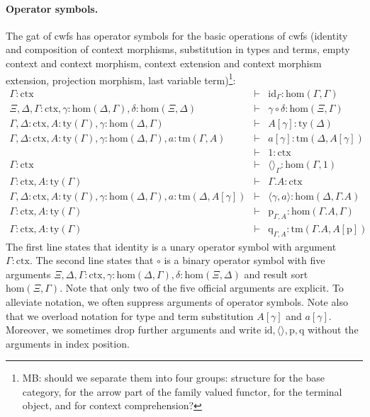 \documentclass[11pt,a4paper]{article}
\theoremstyle{plain}
\theoremstyle{definition}
\newcommand{\id}{\mathsf{id}}
\def\Hom{\mathrm{hom}}
\def\id{\mathrm{id}}
\newcommand{\ctx}{\mathrm{ctx}}
\newcommand{\ty}{\mathrm{ty}}
\newcommand{\tm}{\mathrm{tm}}
\newcommand{\tuple}[1]{\langle #1 \rangle}
\newcommand{\cext}{.}
\def\p{\mathrm{p}}
\def\q{\mathrm{q}}
\begin{document}
\paragraph{Operator symbols.}
The gat of cwfs has operator symbols for the basic operations of cwfs (identity and composition of context morphisms, substitution in types and terms, empty context and context morphism, context extension and context morphism extension, projection morphism, last variable term)\footnote{MB: should we separate them into four groups: structure for the base category, for the arrow part of the family valued functor, for the terminal object, and for context comprehension?}: 
\begin{eqnarray*}
\Gamma : \ctx &\vdash& \id_{\Gamma} : \Hom(\Gamma,\Gamma)\\
\Xi,\Delta,\Gamma : \ctx, \gamma : \Hom(\Delta,\Gamma), \delta : \Hom(\Xi,\Delta) &\vdash&
\gamma \circ \delta : \Hom(\Xi,\Gamma)\\
\Gamma,\Delta : \ctx, A:\ty(\Gamma), \gamma : \Hom(\Delta,\Gamma) &\vdash&
A[\gamma] : \ty(\Delta)\\
\Gamma,\Delta : \ctx, A:\ty(\Gamma), \gamma : \Hom(\Delta,\Gamma), a:\tm(\Gamma,A) &\vdash&  a[\gamma] : \tm(\Delta,A[\gamma])\\
&\vdash& 1 : \ctx\\
\Gamma : \ctx &\vdash& \tuple{}_\Gamma : \Hom(\Gamma,1)\\
\Gamma : \ctx, A:\ty(\Gamma) &\vdash& \Gamma\cext A : \ctx\\
\Gamma,\Delta : \ctx, A:\ty(\Gamma), \gamma : \Hom(\Delta,\Gamma), a:\tm(\Delta,A[\gamma]) &\vdash& \tuple{\gamma,a} : \Hom(\Delta,\Gamma\cext A)\\
\Gamma : \ctx, A:\ty(\Gamma) &\vdash& \p_{\Gamma,A}: \Hom(\Gamma\cext A,\Gamma)\\
\Gamma : \ctx, A:\ty(\Gamma) &\vdash& \q_{\Gamma,A}: \tm(\Gamma\cext A,A[\p])
\end{eqnarray*}
The first line states that identity is a unary operator symbol with argument $\Gamma : \ctx$. The second line states that $\circ$ is a binary operator symbol with five arguments $\Xi,\Delta,\Gamma : \ctx, \gamma : \Hom(\Delta,\Gamma), \delta : \Hom(\Xi,\Delta)$ and result sort $\Hom(\Xi,\Gamma)$. Note that only two of the five official arguments are explicit. To alleviate notation, we often suppress arguments of operator symbols. Note also that we overload notation for type and term substitution $A[\gamma]$ and $a[\gamma]$. Moreover, we sometimes drop further arguments and write $\id, \tuple{},\p,\q$ without the arguments in index position.
\end{document}
